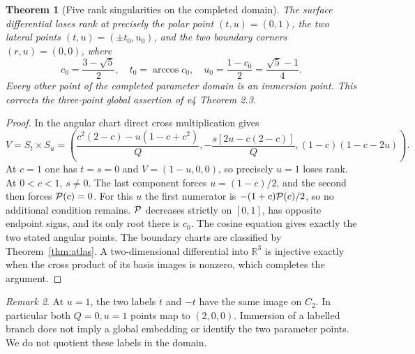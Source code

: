 \documentclass[11pt,a4paper]{article}
\newtheorem{theorem}{Theorem}[section]
\theoremstyle{definition}\newtheorem{definition}[theorem]{Definition}
\theoremstyle{remark}\newtheorem{remark}[theorem]{Remark}
\newcommand{\R}{\mathbb R}\newcommand{\C}{\mathbb C}
\begin{document}
\begin{theorem}[Five rank singularities on the completed domain]\label{thm:regularity}
The surface differential loses rank at precisely the polar point $(t,u)=(0,1)$,
the two lateral points $(t,u)=(\pm t_0,u_0)$, and the two boundary
corners $(r,u)=(0,0)$, where
\[
 c_0=\frac{3-\sqrt5}{2},\quad t_0=\arccos c_0,\quad
 u_0=\frac{1-c_0}{2}=\frac{\sqrt5-1}{4}.
\]
Every other point of the completed parameter domain is an immersion point.
This corrects the three-point global assertion of v4 Theorem 2.3.
\end{theorem}
\begin{proof}
In the angular chart direct cross multiplication gives
\begin{equation}\label{eq:cross}
 V=S_t\times S_u=\left(
 \frac{c^2(2-c)-u(1-c+c^2)}Q,
 -\frac{s[2u-c(2-c)]}Q,
 (1-c)(1-c-2u)\right).
\end{equation}
At $c=1$ one has $t=s=0$ and $V=(1-u,0,0)$, so precisely $u=1$
loses rank. At $0<c<1$, $s\ne0$. The last component forces
$u=(1-c)/2$, and the second then forces $\mathcal P(c)=0$.
For this $u$ the first numerator is
$-(1+c)\mathcal P(c)/2$, so no additional condition remains.
$\mathcal P$ decreases strictly on $[0,1]$, has opposite endpoint signs,
and its only root there is $c_0$. The cosine equation gives exactly the
two stated angular points. The boundary charts are classified by
Theorem~\ref{thm:atlas}. A two-dimensional differential into $\R^3$ is
injective exactly when the cross product of its basis images is nonzero,
which completes the argument.
\end{proof}
\begin{remark}
At $u=1$, the two labels $t$ and $-t$ have the same image on $C_2$.
In particular both $Q=0,u=1$ points map to $(2,0,0)$. Immersion of a
labelled branch does not imply a global embedding or identify the two
parameter points. We do not quotient these labels in the domain.
\end{remark}
\end{document}
